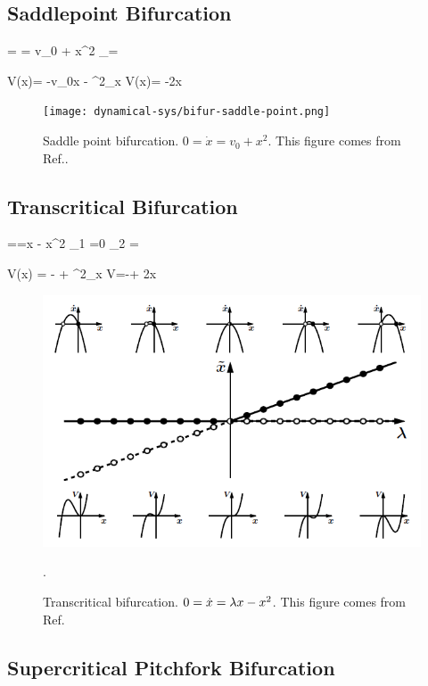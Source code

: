 \subsection{Saddlepoint Bifurcation}

=  = v_0 + x^2 \implies
 _{\pm}=\pm {}
 \eeq
 
 
 \beq
 V(x)= -v_0x -
 \implies
 \partial^2_x V(x)= -2x
 \eeq
 
 \begin{figure}[h!]
 \centering
 \texttt{[image: dynamical-sys/bifur-saddle-point.png]}
 \caption{Saddle point bifurcation. $0= \dot{x} = v_0 + x^2$. This
 figure  comes from Ref.\cite{dynamical-fuchs}.}
 \label{fig-bifur-saddle-point}
 \end{figure}
 
\subsection{Transcritical Bifurcation}

==\lam x - x^2
\implies  {}_1 =0\;\;\;
_2 =\lam
\eeq

\beq
V(x) = -\lam{}
+
\implies
\partial^2_x V=-\lam + 2x
\eeq

\begin{figure}[h!]
 \centering
 \includegraphics[width=5in]
 {dynamical-sys/bifur-trans.png}
 \caption{Transcritical bifurcation. $0=\dot{x}=\lambda x - x^2$. This
 figure  comes from Ref.\cite{dynamical-fuchs}}.
 \label{fig-bifur-trans}
 \end{figure}
 
\subsection{Supercritical 
Pitchfork Bifurcation}

